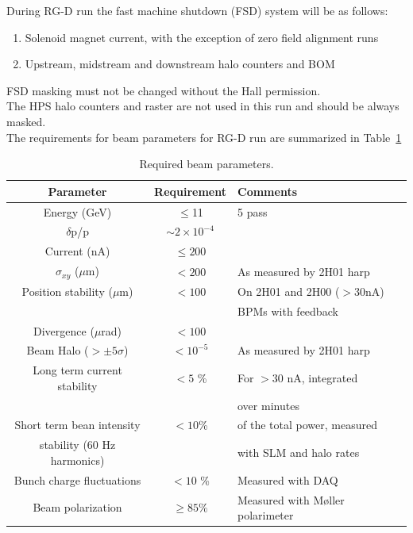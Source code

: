 \documentclass[11pt]{article}
\begin{document}
During RG-D run the fast machine shutdown (FSD) system will be as follows:
\begin{enumerate}
\item Solenoid magnet current, with the exception of zero field alignment runs
\item Upstream, midstream and downstream halo counters and BOM
\end{enumerate}

FSD masking must not be changed without the Hall permission.\\
The HPS halo counters and raster are not used in this run and should be always masked.\\

The requirements for beam parameters for RG-D run are summarized in Table~\ref{tab:beam_par}

 \begin{table}[htb]
\caption{Required beam parameters.}\label{tab:beam_par}
\centering
 \begin{tabular}{|c|c|l|}
\hline
Parameter & Requirement &Comments \\ \hline 
Energy (GeV) & $\leq$11   & 5 pass  \\  \hline
$\delta$p/p & $\sim 2\times 10^{-4}$ & \\ \hline 
Current (nA) & $\le 200$ & \\  \hline
$\sigma_{xy}$ ($\mu$m) &$ < 200$& As measured by 2H01 harp \\ \hline 
Position stability ($\mu$m) & $< 100$ & On 2H01 and 2H00 ($>30$nA) \\ 
&&BPMs with feedback \\ \hline
Divergence ($\mu$rad) & $< 100$&  \\ \hline 
Beam Halo ($> \pm 5\sigma$) &$< 10^{-5}$&As measured by 2H01 harp \\ \hline
Long term current stability & $< 5$ \% & For $>30$ nA, integrated \\
&&over minutes \\ \hline 
Short term bean intensity & $<10$\%& of the total power, measured \\stability (60 Hz harmonics) && with SLM and halo rates \\ \hline
Bunch charge fluctuations &$< 10$ \% & Measured with DAQ \\ \hline
Beam polarization & $\geq 85\%$&Measured with M{\o}ller polarimeter\\ \hline
 \end{tabular}
\end{table}
\end{document}
